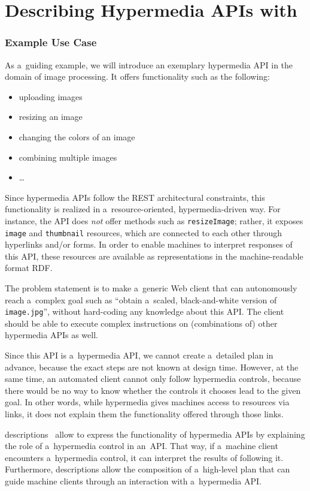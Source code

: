 \section{Describing Hypermedia APIs with \restdesc}
\label{sec:RESTdesc}
\subsubsection{Example Use Case}\label{usecase}
As a~guiding example, we will introduce an exemplary hypermedia API
in the domain of image processing.
It offers functionality such as the following:
\begin{itemize}
  \item uploading images
  \item resizing an image
  \item changing the colors of an image
  \item combining multiple images
  \item \ldots
\end{itemize}
Since hypermedia APIs follow the REST architectural constraints,
this functionality is realized in a~resource-oriented, hypermedia-driven way.
For instance, the API does \emph{not} offer methods such as \verb!resizeImage!;
rather, it exposes \verb!image! and \verb!thumbnail! resources,
which are connected to each other through hyperlinks and/or forms.
In order to enable machines to interpret responses of this API,
these resources are available as representations in the machine-readable format RDF.

The problem statement is to make a~generic Web client
that can autonomously reach a~complex goal such as
``obtain a~scaled, black-and-white version of \verb!image.jpg!'',
without hard-coding any knowledge about this API.
The client should be able to execute complex instructions
on (combinations of) other hypermedia APIs as well.

Since this API is a~hypermedia API,
we cannot create a~detailed plan in advance,
because the exact steps are not known at design time.
However, at the same time,
an automated client cannot only follow hypermedia controls,
because there would be no way to know
whether the controls it chooses lead to the given goal.
In other words,
while hypermedia gives machines access to resources via links,
it does not explain them the functionality offered through those links.

\restdesc descriptions~\cite{verborgh_wsrest_2012,verborgh_mtap_2013}
allow to express the functionality of hypermedia APIs
by explaining the role of a~hypermedia control in an~API.
That way, if a~machine client encounters a~hypermedia control,
it can interpret the results of following it.
Furthermore, \restdesc descriptions allow the composition of a~high-level plan
that can guide machine clients through an interaction with a~hypermedia API.

